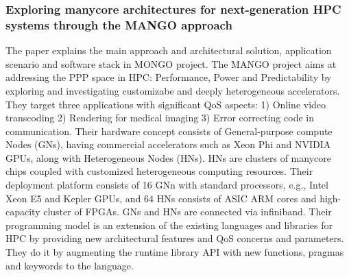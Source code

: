 \subsubsection{Exploring manycore architectures for next-generation HPC systems through the MANGO approach}
The paper explains the main approach and architectural solution, application scenario and software stack in MONGO project. The MANGO project aims at addressing the PPP space in HPC: Performance, Power and Predictability by exploring and investigating customizabe and deeply heterogeneous accelerators. They target three applications with significant QoS aspects: 1) Online video transcoding 2) Rendering for medical imaging 3) Error correcting code in communication. Their hardware concept consists of General-purpose compute Nodes (GNs), having commercial accelerators such as Xeon Phi and NVIDIA GPUs, along with Heterogeneous Nodes (HNs). HNs are clusters of manycore chips coupled with customized heterogeneous computing resources. Their deployment platform consists of 16 GNn with standard processors, e.g., Intel Xeon E5 and Kepler GPUs, and 64 HNs consists of ASIC ARM cores and high-capacity cluster of FPGAs. GNs and HNs are connected via infiniband. Their programming model is an extension of the existing languages and libraries for HPC by providing new architectural features and QoS concerns and parameters. They do it by augmenting the runtime library API with new functions, pragmas and keywords to the language.

